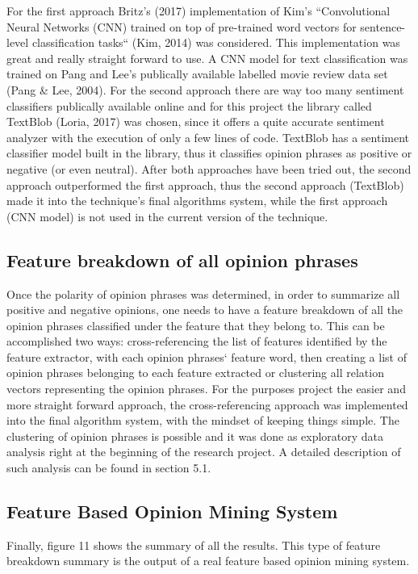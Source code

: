 \documentclass{sig-alternate}
\begin{document}
For the first approach Britz's (2017) implementation of Kim's ``Convolutional Neural Networks (CNN) trained on top of pre-trained word vectors for sentence-level classification tasks``  (Kim, 2014)  was considered. This implementation was great and really straight forward to use. A CNN model for text classification was trained on Pang and Lee's publically available labelled movie review data set (Pang \& Lee, 2004). 
For the second approach there are way too many sentiment classifiers publically available online and for this project the library called TextBlob (Loria, 2017) was chosen, since it offers a quite accurate sentiment analyzer with the execution of only a few lines of code. TextBlob has a sentiment classifier model built in the library, thus it classifies opinion phrases as positive or negative (or even neutral).
After both approaches have been tried out, the second approach outperformed the first approach, thus the second approach (TextBlob) made it into the technique's final algorithms system, while the first approach (CNN model) is not used in the current version of the technique.

\subsection{Feature breakdown of all opinion phrases}
Once the polarity of opinion phrases was determined, in order to summarize all positive and negative opinions, one needs to have a feature breakdown of all the opinion phrases classified under the feature that they belong to. This can be accomplished two ways: cross-referencing the list of features identified by the feature extractor, with each opinion phrases` feature word, then creating a list of opinion phrases belonging to each feature extracted or clustering all relation vectors representing the opinion phrases. For the purposes project the easier and more straight forward approach, the cross-referencing approach was implemented into the final algorithm system, with the mindset of keeping things simple. The clustering of opinion phrases is possible and it was done as exploratory data analysis right at the beginning of the research project. A detailed description of such analysis can be found in section 5.1. 

\subsection{Feature Based Opinion Mining System}
Finally, figure 11 shows the summary of all the results. This type of feature breakdown summary is the output of a real feature based opinion mining system.
\end{document}
